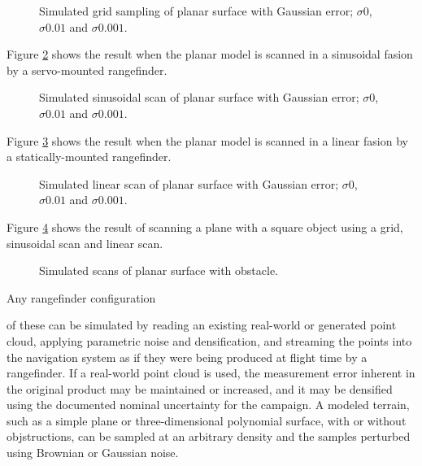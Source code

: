 \documentclass[10pt,a4paper]{report}
\begin{document}
\begin{figure}
\centering
\def\svgscale{0.25}

\def\svgscale{0.25}

\def\svgscale{0.25}

\caption{Simulated grid sampling of planar surface with Gaussian error; $\sigma 0$, $\sigma 0.01$ and $\sigma 0.001$.}
\label{fig:point_plane}
\end{figure}


Figure \ref{fig:sinus_plane} shows the result when the planar model is scanned in a sinusoidal fasion by a servo-mounted rangefinder.

\begin{figure}
\centering
\def\svgscale{0.25}

\def\svgscale{0.25}

\def\svgscale{0.25}

\caption{Simulated sinusoidal scan of planar surface with Gaussian error; $\sigma 0$, $\sigma 0.01$ and $\sigma 0.001$.}
\label{fig:sinus_plane}
\end{figure}


Figure \ref{fig:linear_plane} shows the result when the planar model is scanned in a linear fasion by a statically-mounted rangefinder.

\begin{figure}
\centering
\def\svgscale{0.25}

\def\svgscale{0.25}

\def\svgscale{0.25}

\caption{Simulated linear scan of planar surface with Gaussian error; $\sigma 0$, $\sigma 0.01$ and $\sigma 0.001$.}
\label{fig:linear_plane}
\end{figure}

Figure \ref{fig:plane_object} shows the result of scanning a plane with a square object using a grid, sinusoidal scan and linear scan.

\begin{figure}
\centering
\def\svgscale{0.25}

\def\svgscale{0.25}

\def\svgscale{0.25}

\caption{Simulated scans of planar surface with obstacle.}
\label{fig:plane_object}
\end{figure}


Any rangefinder configuration

of these can be simulated by reading an existing real-world or generated point cloud, applying parametric noise and densification, and streaming the points into the navigation system as if they were being produced at flight time by a rangefinder. If a real-world point cloud is used, the measurement error inherent in the original product may be maintained or increased, and it may be densified using the documented nominal uncertainty for the campaign. A modeled terrain, such as a simple plane or three-dimensional polynomial surface, with or without objstructions, can be sampled at an arbitrary density and the samples perturbed using Brownian or Gaussian noise.
\end{document}
